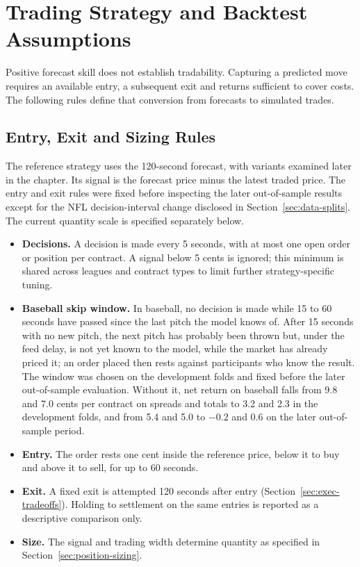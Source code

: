 \documentclass[12pt,a4paper,oneside]{report}
\begin{document}
\section{Trading Strategy and Backtest Assumptions}\label{sec:execution}
Positive forecast skill does not establish tradability. Capturing a predicted
move requires an available entry, a subsequent exit and returns sufficient to
cover costs. The following rules define that conversion from forecasts to
simulated trades.
\subsection{Entry, Exit and Sizing Rules}
The reference strategy uses the 120-second forecast, with variants examined
later in the chapter. Its signal is the forecast price minus the latest traded
price. The entry and exit rules were fixed before inspecting the later
out-of-sample results except for the
NFL decision-interval change disclosed in Section~\ref{sec:data-splits}. The
current quantity scale is specified separately below.
\begin{itemize}
  \item \textbf{Decisions.} A decision is made every 5 seconds, with at most one
        open order or position per contract. A signal below 5 cents is ignored; this
        minimum is shared across leagues and contract types to limit further
        strategy-specific tuning.
  \item \textbf{Baseball skip window.} In baseball, no decision is made while 15 to
        60 seconds have passed since the last pitch the model knows of. After 15
        seconds with no new pitch, the next pitch has probably been thrown but, under
        the feed delay, is not yet known to the model, while the market has already
        priced it; an order placed then rests against participants who know the
        result. The window was chosen on the development folds and fixed before
        the later out-of-sample evaluation. Without it, net return on baseball falls from 9.8
        and 7.0 cents per contract on spreads and totals to 3.2 and 2.3 in the
        development folds, and from 5.4 and 5.0 to $-0.2$ and 0.6 on the later
        out-of-sample period.
  \item \textbf{Entry.} The order rests one cent inside the reference price, below it
        to buy and above it to sell, for up to 60 seconds.
  \item \textbf{Exit.} A fixed exit is attempted 120 seconds after entry
        (Section~\ref{sec:exec-tradeoffs}). Holding to settlement on the same entries
        is reported as a descriptive comparison only.
  \item \textbf{Size.} The signal and trading width determine quantity as
        specified in Section~\ref{sec:position-sizing}.
\end{itemize}
\end{document}

